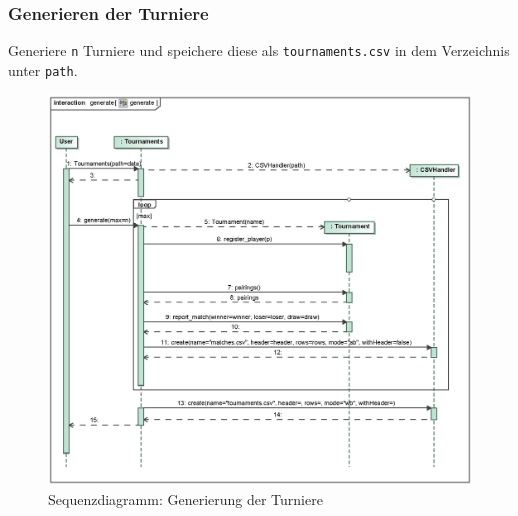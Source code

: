 \subsubsection{Generieren der Turniere}
Generiere \verb|n| Turniere und speichere diese als \verb|tournaments.csv| in dem Verzeichnis unter \verb|path|.
\begin{figure}[H]
    \myfloatalign
    \includegraphics[width=1.1\textwidth]{gfx/MtGDeepAnalysis/cli_generate.eps}
    \caption{Sequenzdiagramm: Generierung der Turniere}
    \label{fig:seq:generate}
\end{figure}

